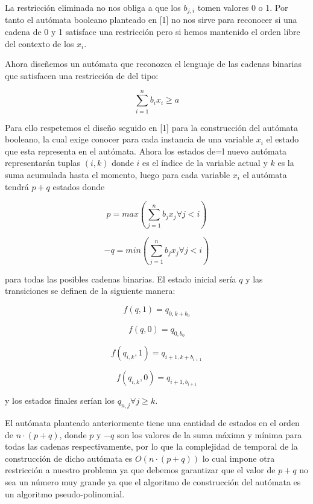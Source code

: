 \documentclass{article}
\begin{document}
La restricción eliminada no nos obliga a que los $b_{j,i}$ tomen valores 0 o 1. Por tanto el autómata booleano planteado en [1] no nos sirve para
reconocer si una cadena de 0 y 1 satisface una restricción pero si hemos mantenido el orden libre del contexto de los $x_i$.

Ahora diseñemos un autómata que reconozca el lenguaje de las cadenas binarias que satisfacen una restricción de del tipo:

\begin{equation}
    \sum_{i = 1}^{n} b_{i}x_i \geq a
\end{equation}

Para ello respetemos el diseño seguido en [1] para la construcción del autómata booleano, la cual exige conocer para cada instancia de una variable
$x_i$ el estado que esta representa en el autómata. Ahora los estados de=l nuevo autómata representarán tuplas $(i,k)$ donde $i$ es el índice de la variable
actual y $k$ es la suma acumulada hasta el momento, luego para cada variable $x_i$ el autómata tendrá $p+q$ estados donde 

\begin{equation}
    p=max(\sum_{j = 1}^{n} b_{j}x_j \forall j<i)    
\end{equation}

\begin{equation}
    -q=min(\sum_{j = 1}^{n} b_{j}x_j \forall j<i)    
\end{equation}

para todas las posibles cadenas binarias. El estado inicial sería $q$ y las transiciones se definen de la siguiente manera:

\begin{equation}
    f(q,1)=q_{0,k+b_{0}}
\end{equation}

\begin{equation}
    f(q,0)=q_{0,b_{0}}
\end{equation}

\begin{equation}
    f(q_{i,k},1)=q_{i+1,k+b_{i+1}}
\end{equation}

\begin{equation}
    f(q_{i,k},0)=q_{i+1,b_{i+1}}
\end{equation}

y los estados finales serían los $q_{n,j} \forall j\geq k$. 

El autómata planteado anteriormente tiene una cantidad de estados en el orden de $n\cdot(p+q)$, donde $p$ y $-q$ son los valores de la suma máxima
y mínima para todas las cadenas respectivamente, por lo que la complejidad de temporal de la construcción de dicho autómata es $O(n\cdot(p+q))$ lo cual 
impone otra restricción a nuestro problema ya que debemos garantizar que el valor de $p+q$ no sea un número muy grande ya que el algoritmo de construcción
del autómata es un algoritmo pseudo-polinomial.
\end{document}
